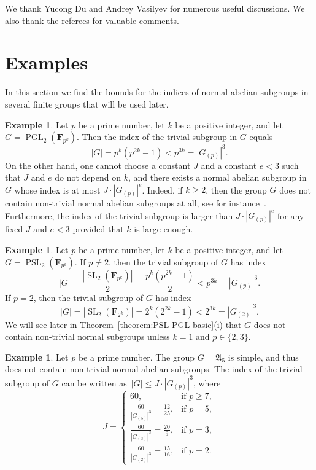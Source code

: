 \documentclass[12pt]{amsart}
\numberwithin{equation}{section}
\theoremstyle{definition}
\newtheorem{example}[subsection]{Example}
\DeclareMathOperator{\SL}{SL}
\DeclareMathOperator{\PGL}{PGL}
\DeclareMathOperator{\PSL}{PSL}
\def \ge {\geqslant}
\def \le {\leqslant}
\begin{document}
We thank Yucong Du and Andrey Vasilyev for numerous useful discussions.
We also thank the referees for valuable comments.

\section{Examples}
\label{section:examples}

In this section we find the bounds for the indices of normal abelian
subgroups in several finite groups that will be used later.

\begin{example}
\label{example:PGL}
Let $p$ be a prime number, let $k$ be a positive integer, and let~\mbox{$G=\PGL_2(\mathbf{F}_{p^k})$}.
Then the index of the trivial subgroup in $G$ equals
$$
|G|=p^k(p^{2k}-1)<p^{3k}=|G_{(p)}|^3.
$$
On the other hand, one cannot choose a constant $J$ and a constant $e<3$
such that $J$ and $e$ do not depend on $k$, and there exists a normal abelian
subgroup in $G$ whose index is at most $J\cdot |G_{(p)}|^e$. Indeed, if $k\ge 2$, then
the group $G$ does not contain non-trivial normal abelian subgroups at all, see
for instance~\mbox{\cite[Lemma 2.4]{ProkhorovShramov}}.
Furthermore, the index of the trivial subgroup is larger than $J\cdot |G_{(p)}|^e$
for any fixed $J$ and $e<3$ provided that $k$ is large enough.
\end{example}

\begin{example}
\label{example:PSL}
Let $p$ be a prime number, let $k$ be a positive integer, and let~\mbox{$G=\PSL_2(\mathbf{F}_{p^k})$}.
If $p\neq 2$, then
the trivial subgroup of $G$ has index
$$
|G|=\frac{|\SL_2(\mathbf{F}_{p^k})|}{2}=\frac{p^k(p^{2k}-1)}{2}
<p^{3k}=|G_{(p)}|^3.
$$
If $p=2$, then
the trivial subgroup of $G$ has index
$$
|G|=|\SL_2(\mathbf{F}_{2^k})|=2^k(2^{2k}-1)<2^{3k}=|G_{(2)}|^3.
$$
We will see later in Theorem~\ref{theorem:PSL-PGL-basic}(i)
that $G$ does not contain non-trivial normal subgroups
unless $k=1$ and $p\in\{2,3\}$.
\end{example}

\begin{example}
\label{example:A5}
Let $p$ be a prime number. The group $G=\mathfrak{A}_5$
is simple, and thus does not contain non-trivial normal abelian subgroups.
The index of the trivial subgroup of $G$ can be written
as~\mbox{$|G|\le J\cdot |G_{(p)}|^3$}, where
\begin{equation*}%
J=\begin{cases}
60, &\text{if\ } p\ge 7,\\
\frac{60}{|G_{(5)}|^3}=\frac{12}{25}, &\text{if\ } p=5,\\
\frac{60}{|G_{(3)}|^3}=\frac{20}{9}, &\text{if\ } p=3,\\
\frac{60}{|G_{(2)}|^3}=\frac{15}{16}, &\text{if\ } p=2.
\end{cases}
\end{equation*}
\end{example}
\end{document}

